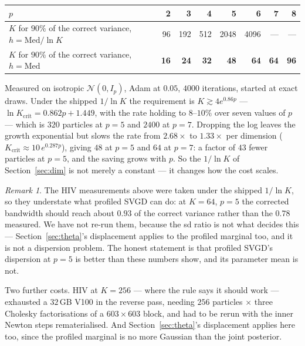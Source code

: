 \documentclass[11pt]{article}
\theoremstyle{remark}
\newtheorem{remark}{Remark}
\begin{document}
\begin{center}\small
\begin{tabular}{lrrrrrrr}
\toprule
$p$ & 2 & 3 & 4 & 5 & 6 & 7 & 8\\
\midrule
$K$ for $90\%$ of the correct variance, $h = \mathrm{Med}/\ln K$ & 96 & 192 & 512 & 2048 & 4096 & --- & ---\\
$K$ for $90\%$ of the correct variance, $h = \mathrm{Med}$ & \textbf{16} & \textbf{24} & \textbf{32} & \textbf{48} & \textbf{64} & \textbf{64} & \textbf{96}\\
\bottomrule
\end{tabular}
\end{center}

Measured on isotropic $\mathcal N(0, I_p)$, Adam at $0.05$, $4000$ iterations, started at exact
draws. Under the shipped $1/\ln K$ the requirement is $K \gtrsim 4e^{0.86p}$ --- $\ln
K_{\mathrm{crit}} = 0.862p + 1.449$, with the rate holding to $8$--$10\%$ over seven values of $p$
--- which is $320$ particles at $p=5$ and $2400$ at $p=7$. Dropping the log leaves the growth
exponential but slows the rate from $2.68\times$ to $1.33\times$ per dimension
($K_{\mathrm{crit}} \approx 10\,e^{0.287p}$), giving $48$ at $p=5$ and $64$ at $p=7$: a factor of
$43$ fewer particles at $p=5$, and the saving grows with $p$. So the $1/\ln K$ of
Section~\ref{sec:dim} is not merely a constant --- it changes how the cost scales.

\begin{remark}
The HIV measurements above were taken under the shipped $1/\ln K$, so they understate what
profiled SVGD can do: at $K = 64$, $p = 5$ the corrected bandwidth should reach about $0.93$ of the
correct variance rather than the $0.78$ measured. We have not re-run them, because the sd ratio is
not what decides this --- Section~\ref{sec:theta}'s displacement applies to the profiled marginal
too, and it is not a dispersion problem. The honest statement is that profiled SVGD's dispersion
at $p=5$ is better than these numbers show, and its parameter mean is not.
\end{remark}

Two further costs. HIV at $K = 256$ --- where the rule says it should work --- exhausted a $32$\,GB
V100 in the reverse pass, needing $256$ particles $\times$ three Cholesky factorisations of a
$603\times603$ block, and had to be rerun with the inner Newton steps rematerialised. And
Section~\ref{sec:theta}'s displacement applies here too, since the profiled marginal is no more
Gaussian than the joint posterior.
\end{document}

